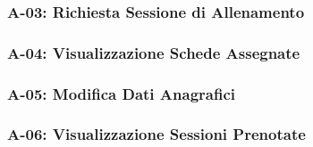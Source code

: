 \subsubsection{A-03: Richiesta Sessione di Allenamento}


\subsubsection{A-04: Visualizzazione Schede Assegnate}


\subsubsection{A-05: Modifica Dati Anagrafici}


\subsubsection{A-06: Visualizzazione Sessioni Prenotate}

